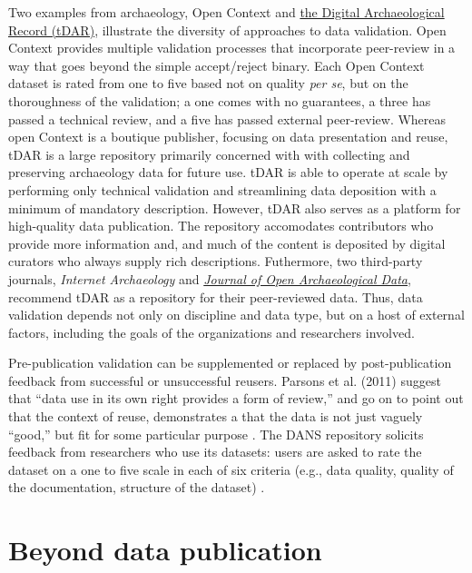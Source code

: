 \documentclass[10pt,twocolumn]{article}
\begin{document}
Two examples from archaeology, Open Context and \href{http://www.tdar.org/}{the Digital Archaeological Record (tDAR)}, illustrate the diversity of approaches to data validation.
Open Context provides multiple validation processes that incorporate peer-review in a way that goes beyond the simple accept/reject binary\cite{kansa_we_2013}.
Each Open Context dataset is rated from one to five based not on quality \emph{per se}, but on the thoroughness of the validation; a one comes with no guarantees, a three has passed a technical review, and a five has passed external peer-review.
Whereas open Context is a boutique publisher, focusing on data presentation and reuse, tDAR is a large repository primarily concerned with with collecting and preserving archaeology data for future use.
tDAR is able to operate at scale by performing only technical validation and streamlining data deposition with a minimum of mandatory description.
However, tDAR also serves as a platform for high-quality data publication.
The repository accomodates contributors who provide more information and, and much of the content is deposited by digital curators who always supply rich descriptions.
Futhermore, two third-party journals, \emph{Internet Archaeology} and \href{http://openarchaeologydata.metajnl.com/}{\emph{Journal of Open Archaeological Data}}, recommend tDAR as a repository for their peer-reviewed data.
Thus, data validation depends not only on discipline and data type, but on a host of external factors, including the goals of the organizations and researchers involved.


Pre-publication validation can be supplemented or replaced by post-publication feedback from successful or unsuccessful reusers.
Parsons et al. (2011) suggest that ``data use in its own right provides a form of review,'' and go on to point out that the context of reuse, demonstrates a that the data is not just vaguely ``good,'' but fit for some particular purpose \cite{parsons_data_2011}.
The DANS repository solicits feedback from researchers who use its datasets: users are asked to rate the dataset on a one to five scale in each of six criteria (e.g., data quality, quality of the documentation, structure of the dataset) \cite{grootveld_data_2011,grootveld_peer-reviewed_2012}.


\section*{Beyond data publication}\label{beyond-data-publication}
\end{document}
